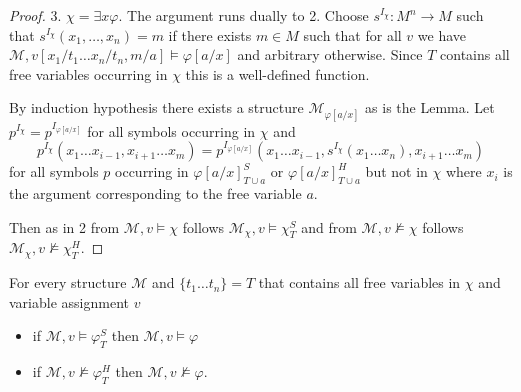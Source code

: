 \documentclass[a4paper,UKenglish,cleveref, autoref, thm-restate]{lipics-v2021}
\begin{document}
\begin{proof}
	3. $\chi = \exists x\varphi$. The argument runs dually to 2. Choose $s^{I_\chi}:M^n\to M$ such that $s^{I_\chi}(x_1,\dots, x_n) = m$ if there exists $m\in M$ such that for all $v$ we have $\mathcal M, v[x_1/t_1\dots x_n/t_n, m/a]\models\varphi[a/x]$ and arbitrary otherwise. Since $T$ contains all free variables occurring in $\chi$ this is a well-defined function.
	
	By induction hypothesis there exists a structure $\mathcal M_{\varphi[a/x]}$ as is the Lemma. Let $p^{I_\chi} = p^{I_{\varphi[a/x]}}$ for all symbols occurring in $\chi$ and $$p^{I_\chi}(x_1\dots x_{i-1}, x_{i+1}\dots x_m) = p^{I_{\varphi[a/x]}}(x_1\dots x_{i-1}, s^{I_\chi}(x_1\dots x_n), x_{i+1}\dots x_m)$$ for all symbols $p$ occurring in $\varphi[a/x]^S_{T\cup a}$ or $\varphi[a/x]^H_{T\cup a}$ but not in $\chi$ where $x_i$ is the argument corresponding to the free variable $a$.
	
	Then as in 2 from $\mathcal M, v\models \chi$ follows $\mathcal M_\chi,v\models\chi^S_T$ and from $\mathcal M, v\not\models \chi$ follows $\mathcal M_\chi,v\not\models\chi^H_T$.
\end{proof}

\begin{lemma}\label{ap2}
	For every structure $\mathcal M$ and $\{t_1\dots t_n\} = T$ that contains all free variables in $\chi$ and variable assignment $v$
	\begin{itemize}
		\item if $\mathcal M, v\models\varphi^S_T$ then $\mathcal M, v\models \varphi$
		\item if $\mathcal M, v\not\models\varphi^H_T$ then $\mathcal M, v\not\models\varphi$.
	\end{itemize}
\end{lemma}
\end{document}
